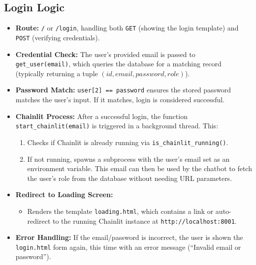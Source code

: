 \subsection{Login Logic}
\label{subsec:login}
\begin{itemize}
  \item \textbf{Route:} \texttt{/} or \texttt{/login}, handling both \texttt{GET} (showing the login template) and
        \texttt{POST} (verifying credentials).
  \item \textbf{Credential Check:} The user’s provided email is passed to \texttt{get\_user(email)}, which queries the
        database for a matching record (typically returning a tuple \((id, email, password, role)\)).
  \item \textbf{Password Match:} \texttt{user[2] == password} ensures the stored password matches the user’s input.
        If it matches, login is considered successful.
  \item \textbf{Chainlit Process:} After a successful login, the function \texttt{start\_chainlit(email)} is triggered
        in a background thread. This:
        \begin{enumerate}
            \item Checks if Chainlit is already running via \texttt{is\_chainlit\_running()}.
            \item If not running, spawns a subprocess with the user’s email set as an environment variable. This email
                  can then be used by the chatbot to fetch the user’s role from the database without needing URL parameters.
        \end{enumerate}
  \item \textbf{Redirect to Loading Screen:} 
        \begin{itemize}
          \item Renders the template \texttt{loading.html}, which contains a link or auto-redirect to the running Chainlit instance at \texttt{http://localhost:8001}.
        \end{itemize}
  \item \textbf{Error Handling:} If the email/password is incorrect, the user is shown the \texttt{login.html} form
        again, this time with an error message (``Invalid email or password'').
\end{itemize}

